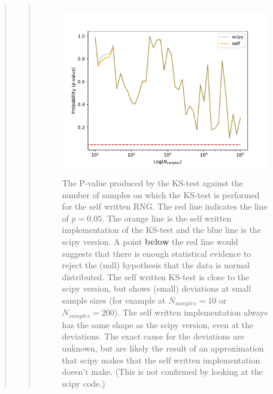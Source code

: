 \begin{quote}
\begin{quote}
\begin{figure}[!hb]
\centering
\includegraphics[width=12cm, height=7.5cm]{./Plots/1_plot_ks_test_self_scipy.pdf}
\caption{The P-value produced by the KS-test against the number of samples on which the KS-test is performed for the self written RNG. The red line indicates the line of $ p = 0.05$. The orange line is the self written implementation of the KS-test and the blue line is the scipy version.  A point \textbf{below} the red line would suggests that there is enough statistical evidence to reject the (null) hypothesis that the data is normal distributed. The self written KS-test is  close to the scipy version, but shows (small) deviations at small sample sizes (for example at $N_{samples} = 10$ or $N_{samples} = 200$).  The self written implementation always has the same shape as the scipy version, even at the deviations. The exact cause for the deviations are unknown, but are likely the result of an approximation that scipy makes that the self written implementation doesn't make. (This is not confirmed by looking at the scipy code.) }
\end{figure}
\end{quote}

\end{quote}



%

%


%











